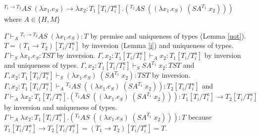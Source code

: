 \begin{case}
$^{T_{1}\rightarrow T_{2}}AS\;(\lambda x_{1}.e_{S})\rightarrow\lambda x_{2}:T_{1}[T_{i}/T_{i}^{a}].(^{T_{2}}AS\;((\lambda x_{1}.e_{S})\;(SA^{T_{1}}\;x_{2})))$ where $A\in\lbrace H,M\rbrace$

$\Gamma\vdash_{A}{^{T_{1}\rightarrow T_{2}}A}S\;(\lambda x_{1}.e_{S}):T$ by premise and uniqueness of types (Lemma \ref{uot}).  $T=(T_{1}\rightarrow T_{2})[T_{i}/T_{i}^{a}]$ by inversion (Lemma \ref{i}) and uniqueness of types.  $\Gamma\vdash_{S}\lambda x_{1}.e_{S}:TST$ by inversion.  $\Gamma,x_{2}:T_{1}[T_{i}/T_{i}^{a}]\vdash_{A}x_{2}:T_{1}[T_{i}/T_{i}^{a}]$ by inversion and uniqueness of types.  $\Gamma,x_{2}:T_{1}[T_{i}/T_{i}^{a}]\vdash_{S}SA^{T_{1}}\;x_{2}:TST$ and $\Gamma,x_{2}:T_{1}[T_{i}/T_{i}^{a}]\vdash_{S}(\lambda x_{1}.e_{S})\;(SA^{T_{1}}\;x_{2}):TST$ by inversion.  $\Gamma,x_{2}:T_{1}[T_{i}/T_{i}^{a}]\vdash_{A}{^{T_{2}}A}S\;((\lambda x_{1}.e_{S})\;(SA^{T_{1}}\;x_{2})):T_{2}[T_{i}/T_{i}^{a}]$ and $\Gamma\vdash_{A}\lambda x_{2}:T_{1}[T_{i}/T_{i}^{a}].(^{T_{2}}AS\;((\lambda x_{1}.e_{S})\;(SA^{T_{1}}\;x_{2}))):T_{1}[T_{i}/T_{i}^{a}]\rightarrow T_{2}[T_{i}/T_{i}^{a}]$ by inversion and uniqueness of types.  $\Gamma\vdash_{A}\lambda x_{2}:T_{1}[T_{i}/T_{i}^{a}].(^{T_{2}}AS\;((\lambda x_{1}.e_{S})\;(SA^{T_{1}}\;x_{2}))):T$ because $T_{1}[T_{i}/T_{i}^{a}]\rightarrow T_{2}[T_{i}/T_{i}^{a}]=(T_{1}\rightarrow T_{2})[T_{i}/T_{i}^{a}]=T$.
\end{case}